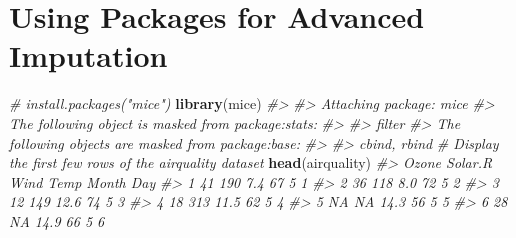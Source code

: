 \documentclass[
]{book}
\newenvironment{Shaded}{\begin{snugshade}}{\end{snugshade}}
\newcommand{\CommentTok}[1]{\textcolor[rgb]{0.56,0.35,0.01}{\textit{#1}}}
\newcommand{\FunctionTok}[1]{\textcolor[rgb]{0.13,0.29,0.53}{\textbf{#1}}}
\newcommand{\NormalTok}[1]{#1}
\begin{document}
\section*{Using Packages for Advanced Imputation}\label{using-packages-for-advanced-imputation}

\begin{Shaded}
\begin{Highlighting}[]
\CommentTok{\# install.packages("mice")}
\FunctionTok{library}\NormalTok{(mice)}
\CommentTok{\#\textgreater{} }
\CommentTok{\#\textgreater{} Attaching package: \textquotesingle{}mice\textquotesingle{}}
\CommentTok{\#\textgreater{} The following object is masked from \textquotesingle{}package:stats\textquotesingle{}:}
\CommentTok{\#\textgreater{} }
\CommentTok{\#\textgreater{}     filter}
\CommentTok{\#\textgreater{} The following objects are masked from \textquotesingle{}package:base\textquotesingle{}:}
\CommentTok{\#\textgreater{} }
\CommentTok{\#\textgreater{}     cbind, rbind}
\CommentTok{\# Display the first few rows of the airquality dataset}
\FunctionTok{head}\NormalTok{(airquality)}
\CommentTok{\#\textgreater{}   Ozone Solar.R Wind Temp Month Day}
\CommentTok{\#\textgreater{} 1    41     190  7.4   67     5   1}
\CommentTok{\#\textgreater{} 2    36     118  8.0   72     5   2}
\CommentTok{\#\textgreater{} 3    12     149 12.6   74     5   3}
\CommentTok{\#\textgreater{} 4    18     313 11.5   62     5   4}
\CommentTok{\#\textgreater{} 5    NA      NA 14.3   56     5   5}
\CommentTok{\#\textgreater{} 6    28      NA 14.9   66     5   6}


\end{Highlighting}
\end{Shaded}
\end{document}
